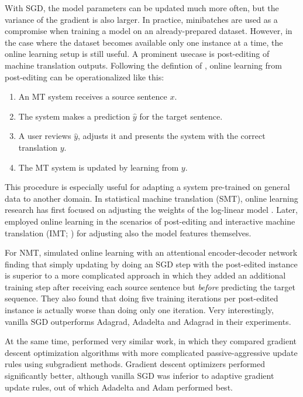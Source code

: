 With SGD, the model parameters can be updated much more often, but the variance
of the gradient is also larger. In practice, minibatches are used as a
compromise when training a model on an already-prepared dataset. However, in the
case where the dataset becomes available only one instance at a time, the online
learning setup is still useful. A prominent usecase is post-editing of machine
translation outputs. Following the defintion of \textcite{ortiz-martinez-2016},
online learning from post-editing can be operationalized like this:

\begin{enumerate}
\item An MT system receives a source sentence \(x\).
\item The system makes a prediction \(\hat{y}\) for the target sentence.
\item A user reviews \(\hat{y}\), adjusts it and presents the system with the
  correct translation \(y\).
\item The MT system is updated by learning from \(y\).
\end{enumerate}

This procedure is especially useful for adapting a system pre-trained on general
data to another domain. In statistical machine translation (SMT), online
learning research has first focused on adjusting the weights of the log-linear
model \parencites(e.g.)(){liang-2006}{arun-2007}{watanabe-2007}. Later,
\textcites{ortiz-martinez-2010}{ortiz-martinez-2016} employed online learning in
the scenarios of post-editing and interactive machine translation (IMT;
\cites{casacuberta-2009}{barrachina-2009}) for adjusting also the model features
themselves.

For NMT, \textcite{turchi-2017} simulated online learning with an attentional
encoder-decoder network finding that simply updating by doing an SGD step with
the post-edited instance is superior to a more complicated approach in which
they added an additional training step after receiving each source sentence but
\emph{before} predicting the target sequence. They also found that doing five
training iterations per post-edited instance is actually worse than doing only
one iteration. Very interestingly, vanilla SGD outperforms Adagrad, Adadelta and
Adagrad in their experiments.  %

At the same time, \textcite{peris-2017} performed very similar work, in which
they compared gradient descent optimization algorithms with more complicated
passive-aggressive update rules using subgradient methods. Gradient descent
optimizers performed significantly better, although vanilla SGD was inferior to
adaptive gradient update rules, out of which Adadelta and Adam performed best.


